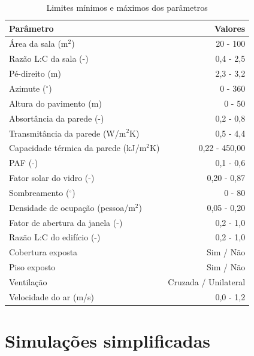 \documentclass[brazil,hardcopy,openany,a4paper]{ufscthesis}
\begin{document}
		\begin{table}[H]
			\centering
			\caption{Limites mínimos e máximos dos parâmetros}
			\label{table:param_def}
			\begin{tabular}{|l |r |}
				\hline
				\textbf{Parâmetro} & \textbf{Valores} \\
				\hline
				Área da sala (m$^2$) & 20 - 100 \\
				\hline
				Razão L:C da sala (-) & 0,4 - 2,5 \\
				\hline
				Pé-direito (m) & 2,3 - 3,2 \\
				\hline
				Azimute ($^{\circ}$) & 0 - 360 \\
				\hline
				Altura do pavimento (m) & 0 - 50 \\
				\hline 
				Absortância da parede (-) & 0,2 - 0,8 \\
				\hline 
				Transmitância da parede (W/m$^2$K) & 0,5 - 4,4 \\
				\hline 
				Capacidade térmica da parede (kJ/m$^2$K) & 0,22 - 450,00 \\
				\hline 
				PAF (-) & 0,1 - 0,6 \\
				\hline 
				Fator solar do vidro (-) & 0,20 - 0,87 \\
				\hline 
				Sombreamento ($^{\circ}$) & 0 - 80 \\
				\hline 
				Densidade de ocupação (pessoa/m$^2$) & 0,05 - 0,20 \\
				\hline 
				Fator de abertura da janela (-) & 0,2 - 1,0 \\
				\hline 
				Razão L:C do edifício (-) & 0,2 - 1,0 \\
				\hline 
				Cobertura exposta & Sim / Não\\
				\hline 
				Piso exposto & Sim / Não\\
				\hline 
				Ventilação & Cruzada / Unilateral\\
				\hline 
				Velocidade do ar (m/s) & 0,0 - 1,2 \\
				\hline 
			\end{tabular}
		\end{table}
		
		\section{Simulações simplificadas}
		
\end{document}
